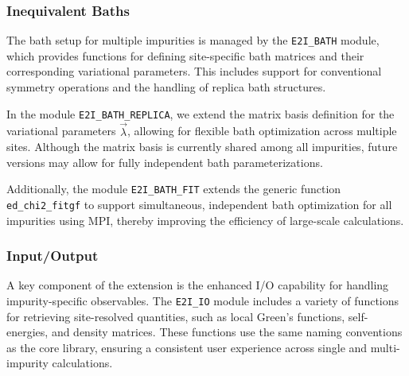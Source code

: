 \documentclass[edipack_sp.tex]{subfiles}
\begin{document}
  


\subsubsection{Inequivalent Baths}\label{ssSecIneqBath}
The bath setup for multiple impurities is managed by the 
{\tt E2I\_BATH} module, which provides functions for defining 
site-specific bath matrices and their corresponding variational 
parameters. This includes support for conventional symmetry operations 
and the handling of replica bath structures. 

In the module {\tt E2I\_BATH\_REPLICA}, we extend the 
matrix basis definition for the variational parameters 
$\vec{\lambda}$, allowing for flexible bath optimization across 
multiple sites. Although the matrix basis is currently shared among 
all impurities, future versions may allow for fully independent 
bath parameterizations.

Additionally, the module {\tt E2I\_BATH\_FIT} extends the generic 
function {\tt ed\_chi2\_fitgf} to support simultaneous, independent 
bath optimization for all impurities using MPI, thereby improving the 
efficiency of large-scale calculations.


 
\subsubsection{Input/Output}\label{ssSecIneqIO}
A key component of the  extension is the 
enhanced I/O capability for handling impurity-specific observables. 
The {\tt E2I\_IO} module includes a variety of functions for 
retrieving site-resolved quantities, such as local Green's functions, 
self-energies, and density matrices. These functions use the same 
naming conventions as the core \NAME library, ensuring a consistent 
user experience across single and multi-impurity calculations.


\ifSubfilesClassLoaded{
  
}{}
\end{document}
